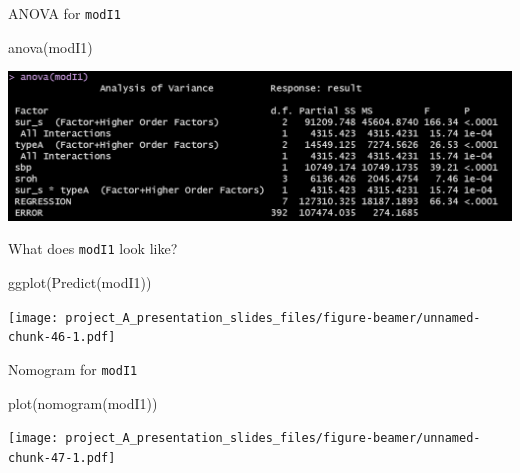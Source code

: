 \documentclass[
  ignorenonframetext,
]{beamer}
\newenvironment{Shaded}{\begin{snugshade}}{\end{snugshade}}
\newcommand{\FunctionTok}[1]{\textcolor[rgb]{0.00,0.00,0.00}{#1}}
\newcommand{\NormalTok}[1]{#1}
\begin{document}
\begin{frame}[fragile]{ANOVA for \texttt{modI1}}
\protect\hypertarget{anova-for-modi1}{}
\begin{Shaded}
\begin{Highlighting}[]
\FunctionTok{anova}\NormalTok{(modI1)}
\end{Highlighting}
\end{Shaded}

\begin{center}\includegraphics[width=0.85\linewidth]{figures/small7b} \end{center}
\end{frame}

\begin{frame}[fragile]{What does \texttt{modI1} look like?}
\protect\hypertarget{what-does-modi1-look-like}{}
\begin{Shaded}
\begin{Highlighting}[]
\FunctionTok{ggplot}\NormalTok{(}\FunctionTok{Predict}\NormalTok{(modI1))}
\end{Highlighting}
\end{Shaded}

\texttt{[image: project\_A\_presentation\_slides\_files/figure-beamer/unnamed-chunk-46-1.pdf]}
\end{frame}

\begin{frame}[fragile]{Nomogram for \texttt{modI1}}
\protect\hypertarget{nomogram-for-modi1}{}
\begin{Shaded}
\begin{Highlighting}[]
\FunctionTok{plot}\NormalTok{(}\FunctionTok{nomogram}\NormalTok{(modI1))}
\end{Highlighting}
\end{Shaded}

\texttt{[image: project\_A\_presentation\_slides\_files/figure-beamer/unnamed-chunk-47-1.pdf]}
\end{frame}
\end{document}
